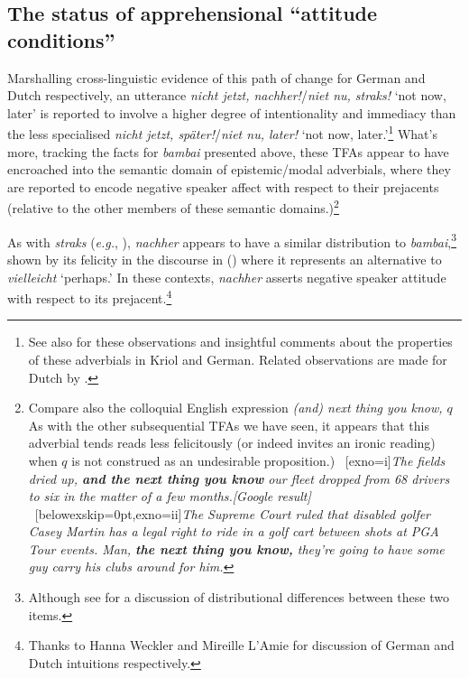 \subsection{The status of apprehensional ``attitude conditions''}
Marshalling cross-linguistic evidence of this path of change for German and Dutch respectively, an utterance \textit{nicht jetzt, nachher!}/\textit{niet nu, straks!} `not now, later' is reported to involve a higher degree of intentionality and immediacy than the less specialised \textit{nicht jetzt, später!}/\textit{niet nu, later!} `not now, later.'\footnote{See also \citealt{Angelo2018} for these observations and insightful comments about the properties of these adverbials in Kriol and German. Related observations are made for Dutch by \citet{Boogaart2020}.} What's more, tracking the facts for \textit{bambai} presented above, these TFAs appear to have encroached into the semantic domain of epistemic/modal adverbials, where they are reported to encode negative speaker affect with respect to their prejacents (relative to the other members of these semantic domains.)\footnote{Compare also the colloquial English expression \textit{(and) next thing you know, $q$} As with the other subsequential TFAs we have seen, it appears that this adverbial tends reads less felicitously (or indeed invites an ironic reading) when $q$ is not construed as an undesirable proposition.)%
	\ex~[exno=i]\label{field}\textit{The fields dried up, \textbf{and the next thing you know} our fleet dropped from 68 drivers to six in the matter of a few months.\hfill[Google result]}\xe
	\ex~[belowexskip=0pt,exno=ii]\label{stew}\textit{The Supreme Court ruled that disabled golfer Casey Martin has a legal right to ride in a golf cart between shots at PGA Tour events. Man, \textbf{the next thing you know,} they're going to have some guy carry his clubs around for him.}\xe}

As with \textit{straks} (\textit{e.g.}, ), \textit{nachher} appears to have a similar distribution to \textit{bambai},\footnote{Although see \citet[30]{Angelo2018} for a discussion of distributional differences between these two items.} shown by its felicity in the discourse in () where it represents an alternative to \textit{vielleicht} `perhaps.'
 In these contexts, \textit{nachher} asserts negative speaker attitude with respect to its prejacent.\footnote{Thanks to Hanna Weckler and Mireille L'Amie for discussion of German and Dutch intuitions respectively.}

